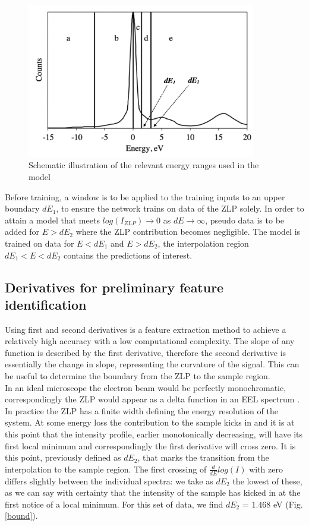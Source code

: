 \begin{figure}[H]
    \centering
    \includegraphics[width=100mm]{plots/ranges.png}
    \caption{Schematic illustration of the relevant energy ranges used in the model}
    \label{ranges}
\end{figure}

Before training, a window is to be applied to the training inputs to an upper boundary $dE_1$, to ensure the network trains on data of the ZLP solely. In order to attain a model that meets $log(I_{ZLP}) \rightarrow 0$ as $dE \rightarrow \infty$, pseudo data is to be added for $E>dE_2$ where the ZLP contribution becomes negligible. The model is trained on data for $E<dE_1$ and $E>dE_2$, the interpolation region $dE_1 < E < dE_2$ contains the predictions of interest. \\

\subsection{Derivatives for preliminary feature identification}

Using first and second derivatives is a feature extraction method to achieve a relatively high accuracy with a low computational complexity. The slope of any function is described by the first derivative, therefore the second derivative is essentially the change in slope, representing the curvature of the signal. This can be useful to determine the boundary from the ZLP to the sample region. \\

In an ideal microscope the electron beam would be perfectly monochromatic, correspondingly the ZLP would appear as a delta function in an EEL spectrum \cite{Rafferty:2000}. In practice the ZLP has a finite width defining the energy resolution of the system. At some energy loss the contribution to the sample kicks in and it is at this point that the intensity profile, earlier monotonically decreasing, will have its first local minimum and correspondingly the first derivative will cross zero. It is this point, previously defined as $dE_2$, that marks the transition from the interpolation to the sample region. The first crossing of $\frac{d}{dE}log(I)$ with zero differs slightly between the individual spectra: we take as $dE_2$ the lowest of these, as we can say with certainty that the intensity of the sample has kicked in at the first notice of a local minimum. For this set of data, we find $dE_2$ = $1.468$ eV (Fig. \ref{bound}). 


